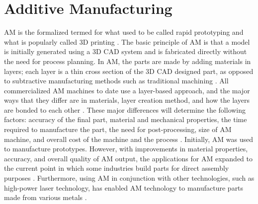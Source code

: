 \section{Additive Manufacturing}
\gls{AM} is the formalized termed for what used to be called rapid prototyping 
and what is popularly called 3D printing \cite{gibson_additive_2014}. 
The basic principle of \gls{AM} is that a model is initially generated using a
\gls{3D CAD} system and is fabricated directly without the need for process 
planning. 
In \gls{AM}, the parts are made by adding materials in layers; each layer is a 
thin cross section of the \gls{3D CAD} designed part, as opposed 
to subtractive manufacturing methods such as traditional machining
\cite{standard_standard_2012}. 
All commercialized \gls{AM} machines to date use a layer-based approach, and 
the major ways that they differ are in materials, layer creation method, and 
how the layers are bonded to each other \cite{gibson_additive_2014}.
These major differences will determine the following factors: accuracy of the 
final part, material and mechanical properties, the time required to manufacture 
the part, the need for post-processing, size of \gls{AM} machine, and overall 
cost of the machine and the process \cite{gibson_additive_2014}. 
Initially, \gls{AM} was used to manufacture prototypes. 
However, with improvements in material properties, accuracy, and overall quality 
of \gls{AM} output, the applications for \gls{AM} expanded to the 
current point in which some industries build parts for direct assembly purposes
\cite{uriondo_present_2015}.  
Furthermore, using \gls{AM} in conjunction with other technologies, such as 
high-power laser technology, has enabled \gls{AM} technology 
to manufacture parts made from various metals \cite{gibson_additive_2014}. 

